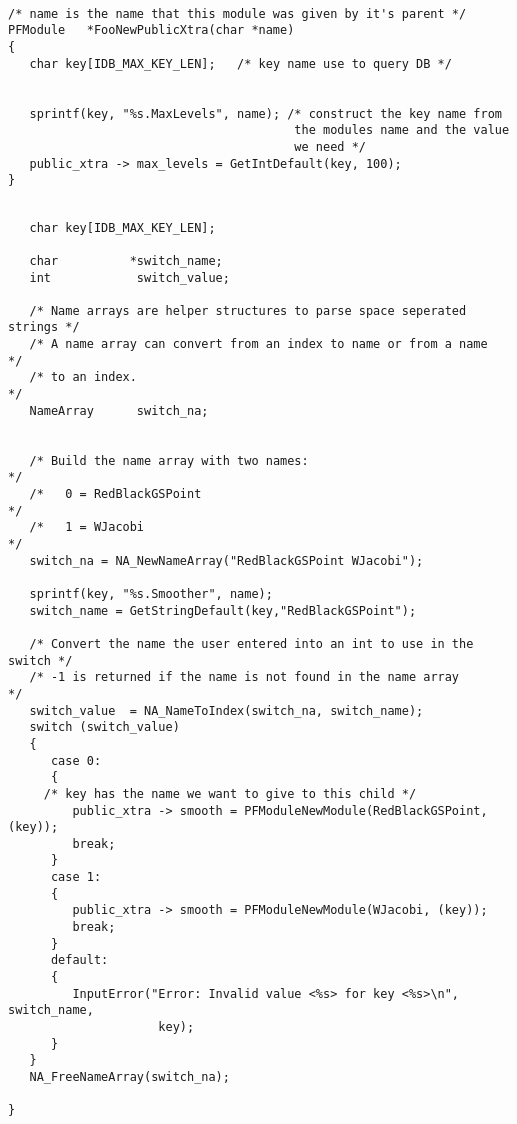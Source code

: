 {\newpage\clearpage
{}%
\begin{display}\begin{verbatim}

/* name is the name that this module was given by it's parent */
PFModule   *FooNewPublicXtra(char *name)
{
   char key[IDB_MAX_KEY_LEN];   /* key name use to query DB */
        

   sprintf(key, "%s.MaxLevels", name); /* construct the key name from
                                        the modules name and the value
                                        we need */
   public_xtra -> max_levels = GetIntDefault(key, 100);
}\end{verbatim}
\end{display}%
\lthtmlfigureZ
\lthtmlcheckvsize\clearpage}

{\newpage\clearpage
{}%
\begin{display}\begin{verbatim}

   char key[IDB_MAX_KEY_LEN];

   char          *switch_name;
   int            switch_value;

   /* Name arrays are helper structures to parse space seperated strings */
   /* A name array can convert from an index to name or from a name      */
   /* to an index.                                                       */
   NameArray      switch_na;

	
   /* Build the name array with two names:                               */
   /*   0 = RedBlackGSPoint                                              */
   /*   1 = WJacobi                                                      */
   switch_na = NA_NewNameArray("RedBlackGSPoint WJacobi");

   sprintf(key, "%s.Smoother", name);
   switch_name = GetStringDefault(key,"RedBlackGSPoint");

   /* Convert the name the user entered into an int to use in the switch */
   /* -1 is returned if the name is not found in the name array          */
   switch_value  = NA_NameToIndex(switch_na, switch_name);
   switch (switch_value)
   {
      case 0:
      {
	 /* key has the name we want to give to this child */
         public_xtra -> smooth = PFModuleNewModule(RedBlackGSPoint, (key));
         break;
      }
      case 1:
      {
         public_xtra -> smooth = PFModuleNewModule(WJacobi, (key));
         break;
      }
      default:
      {
         InputError("Error: Invalid value <%s> for key <%s>\n", switch_name,
                     key);
      }
   }
   NA_FreeNameArray(switch_na);

}\end{verbatim}
\end{display}%
\lthtmlfigureZ
\lthtmlcheckvsize\clearpage}

